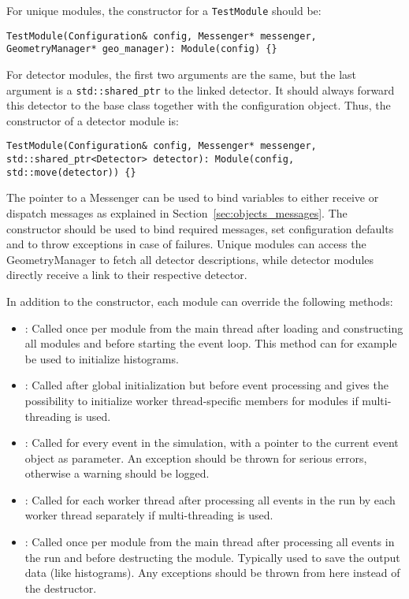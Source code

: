 For unique modules, the constructor for a \texttt{TestModule} should be:
\begin{verbatim}
TestModule(Configuration& config, Messenger* messenger, GeometryManager* geo_manager): Module(config) {}
\end{verbatim}

For detector modules, the first two arguments are the same, but the last argument is a \texttt{std::shared\_ptr} to the linked detector.
It should always forward this detector to the base class together with the configuration object.
Thus, the constructor of a detector module is:
\begin{verbatim}
TestModule(Configuration& config, Messenger* messenger, std::shared_ptr<Detector> detector): Module(config, std::move(detector)) {}
\end{verbatim}

The pointer to a Messenger can be used to bind variables to either receive or dispatch messages as explained in Section~\ref{sec:objects_messages}.
The constructor should be used to bind required messages, set configuration defaults and to throw exceptions in case of failures.
Unique modules can access the GeometryManager to fetch all detector descriptions, while detector modules directly receive a link to their respective detector.

In addition to the constructor, each module can override the following methods:
\begin{itemize}
\item {}: Called once per module from the main thread after loading and constructing all modules and before starting the event loop.
This method can for example be used to initialize histograms.
\item {}: Called after global initialization but before event processing and gives the possibility to initialize worker thread-specific members for modules if multi-threading is used.
\item {}: Called for every event in the simulation, with a pointer to the current event object as parameter.
An exception should be thrown for serious errors, otherwise a warning should be logged.
\item {}: Called for each worker thread after processing all events in the run by each worker thread separately if multi-threading is used.
\item {}: Called once per module from the main thread after processing all events in the run and before destructing the module.
Typically used to save the output data (like histograms).
Any exceptions should be thrown from here instead of the destructor.
\end{itemize}

